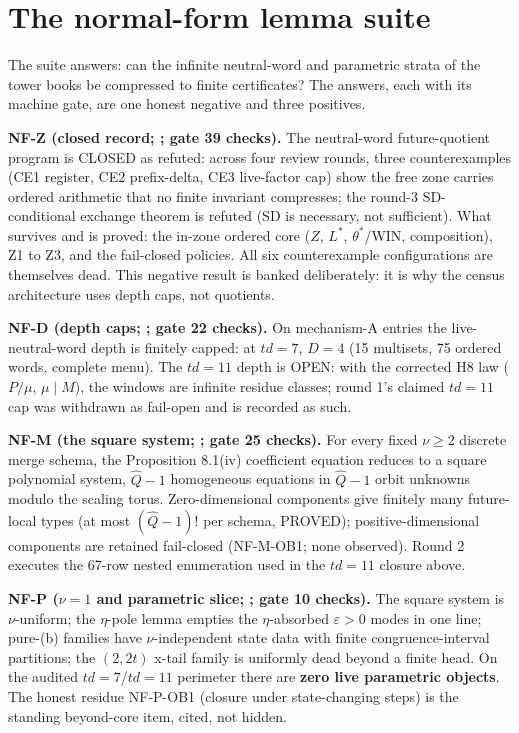 \documentclass[11pt]{article}
\theoremstyle{definition}
\theoremstyle{remark}
\begin{document}
\section{The normal-form lemma suite}\label{sec:nf}

The suite answers: can the infinite neutral-word and parametric strata of
the tower books be compressed to finite certificates? The answers, each
with its machine gate, are one honest negative and three positives.

\textbf{NF-Z (closed record; ; gate 39 checks).} The neutral-word
future-quotient program is CLOSED as refuted: across four review rounds,
three counterexamples (CE1 register, CE2 prefix-delta, CE3 live-factor cap)
show the free zone carries ordered arithmetic that no finite invariant
compresses; the round-3 SD-conditional exchange theorem is refuted (SD is
necessary, not sufficient). What survives and is proved: the in-zone
ordered core ($Z$, $L^*$, $\theta^*$/WIN, composition), Z1 to Z3, and the
fail-closed policies. All six counterexample configurations are themselves
dead. This negative result is banked deliberately: it is why the census
architecture uses depth caps, not quotients.

\textbf{NF-D (depth caps; ; gate 22 checks).} On mechanism-A
entries the live-neutral-word depth is finitely capped: at $td=7$, $D=4$
(15 multisets, 75 ordered words, complete menu). The $td=11$ depth is OPEN:
with the corrected H8 law ($P/\mu$, $\mu\mid M$), the windows are infinite
residue classes; round 1's claimed $td=11$ cap was withdrawn as fail-open
and is recorded as such.

\textbf{NF-M (the square system; ; gate 25 checks).} For every
fixed $\nu\ge 2$ discrete merge schema, the Proposition 8.1(iv) coefficient
equation reduces to a square polynomial system, $\hat Q-1$ homogeneous
equations in $\hat Q-1$ orbit unknowns modulo the scaling torus.
Zero-dimensional components give finitely many future-local types (at most
$(\hat Q-1)!$ per schema, PROVED); positive-dimensional components are
retained fail-closed (NF-M-OB1; none observed). Round 2 executes the 67-row
nested enumeration used in the $td=11$ closure above.

\textbf{NF-P ($\nu=1$ and parametric slice; ; gate 10 checks).}
The square system is $\nu$-uniform; the $\eta$-pole lemma empties the
$\eta$-absorbed $\varepsilon>0$ modes in one line; pure-(b) families have
$\nu$-independent state data with finite congruence-interval partitions;
the $(2,2t)$ x-tail family is uniformly dead beyond a finite head. On the
audited $td=7$/$td=11$ perimeter there are \textbf{zero live parametric
objects}. The honest residue NF-P-OB1 (closure under state-changing steps)
is the standing beyond-core item, cited, not hidden.
\end{document}
